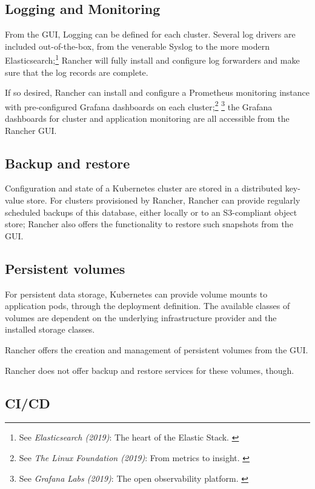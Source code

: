 \subsection{Logging and Monitoring}

From the GUI, Logging can be defined for each cluster. Several log drivers are included out-of-the-box, from the venerable Syslog to the more modern Elasticsearch;\footnote{See \textit{Elasticsearch (2019)}: The heart of the Elastic Stack. \cite{elastic}} Rancher will fully install and configure log forwarders and make sure that the log records are complete.

If so desired, Rancher can install and configure a Prometheus monitoring instance with pre-configured Grafana dashboards on each cluster;\footnote{See \textit{The Linux Foundation (2019)}: From metrics to insight. \cite{prometheus}} \footnote{See \textit{Grafana Labs (2019)}: The open observability platform. \cite{grafana}} the Grafana dashboards for cluster and application monitoring are all accessible from the Rancher GUI.

\subsection{Backup and restore}

Configuration and state of a Kubernetes cluster are stored in a distributed key-value store. For clusters provisioned by Rancher, Rancher can provide regularly scheduled backups of this database, either locally or to an S3-compliant object store; Rancher also offers the functionality to restore such snapshots from the GUI.

\subsection{Persistent volumes}

For persistent data storage, Kubernetes can provide volume mounts to application pods, through the deployment definition. The available classes of volumes are dependent on the underlying infrastructure provider and the installed storage classes.

Rancher offers the creation and management of persistent volumes from the GUI.

Rancher does not offer backup and restore services for these volumes, though.

\subsection{CI/CD}

